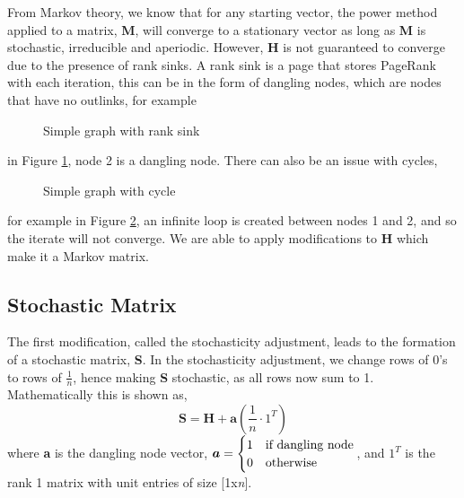 \documentclass[11pt]{report}
\begin{document}
From Markov theory, we know that for any starting vector, the power method applied to a matrix, \textbf{M},  will converge to a stationary vector as long as \textbf{M} is stochastic, irreducible and aperiodic. However, \textbf{H} is not guaranteed to converge due to the presence of rank sinks. A rank sink is a page that stores PageRank with each iteration, this can be in the form of dangling nodes, which are nodes that have no outlinks, for example 
\begin{figure}[h]
\centering
{} \caption{Simple graph with rank sink} \label{dangling} 
\end{figure} in Figure \ref{dangling}, node 2 is a dangling node. There can also be an issue with cycles,
\begin{figure}[h]
\centering
{} \caption{Simple graph with cycle} \label{cycle}
\end{figure} for example in Figure \ref{cycle}, an infinite loop is created between nodes 1 and 2, and so the iterate will not converge. We are able to apply modifications to \textbf{H} which make it a Markov matrix.

\subsection{Stochastic Matrix}
The first modification, called the stochasticity adjustment, leads to the formation of a stochastic matrix, \textbf{S}. In the stochasticity adjustment, we change rows of 0's to rows of $\frac{1}{n}$, hence making \textbf{S} stochastic, as all rows now sum to 1. Mathematically this is shown as, \begin{equation} \label{s}
\textbf{S} = \textbf{H} + \textbf{a}\left(\frac{1}{n}\cdot 1^{T}\right)
\end{equation} where \textbf{a} is the dangling node vector, \(\boldsymbol{a} = \begin{cases} 1 & \textnormal{if dangling node} \\ 0 & \textnormal{otherwise} \end{cases}\), and $1^T$ is the rank 1 matrix with unit entries of size [1x\textit{n}].
\end{document}
